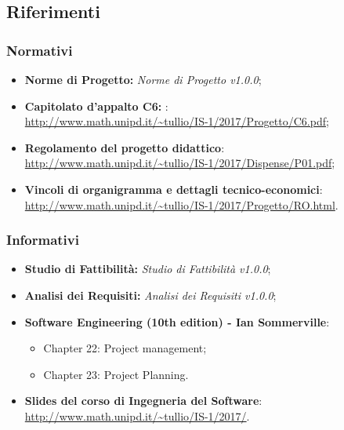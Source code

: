 \subsection{Riferimenti}
\subsubsection{Normativi}
\begin{itemize}
	\item \textbf{Norme di Progetto: }\textit{Norme di Progetto v1.0.0};
	\item \textbf{Capitolato d'appalto C6: \NomeProgetto}:\\
	\url{http://www.math.unipd.it/~tullio/IS-1/2017/Progetto/C6.pdf};
	\item \textbf{Regolamento del progetto didattico}:\\
	\url{http://www.math.unipd.it/~tullio/IS-1/2017/Dispense/P01.pdf};
	\item \textbf{Vincoli di organigramma e dettagli tecnico-economici}:\\
	\url{http://www.math.unipd.it/~tullio/IS-1/2017/Progetto/RO.html}.
\end{itemize}
\subsubsection{Informativi}
\begin{itemize}
	\item \textbf{Studio di Fattibilità: }\textit{Studio di Fattibilità v1.0.0};
	\item \textbf{Analisi dei Requisiti: }\textit{Analisi dei Requisiti v1.0.0};
	\item \textbf{Software Engineering (10th edition) - Ian Sommerville}:
	\begin{itemize}
		\item Chapter 22: Project management;
		\item Chapter 23: Project Planning.
	\end{itemize}
	\item \textbf{Slides del corso di Ingegneria del Software}:\\
	\url{http://www.math.unipd.it/~tullio/IS-1/2017/}.
\end{itemize}

